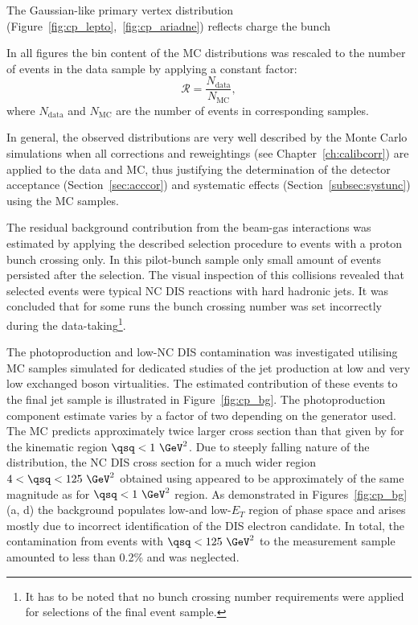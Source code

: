 The Gaussian-like primary vertex distribution (Figure~\ref{fig:cp_lepto},~\ref{fig:cp_ariadne}) reflects charge the bunch 

 In all figures the bin content of the MC distributions was rescaled to the number of events in the data sample by applying a constant factor:
\begin{equation}
\mathcal{R} = \frac{N_\text{data}}{N_\text{MC}},
\label{eq:mcrescale}
\end{equation}
where $N_\text{data}$ and $N_\text{MC}$ are the number of events in corresponding samples. 

In general, the observed distributions are very well described by the Monte Carlo simulations when all corrections and reweightings (see Chapter~\ref{ch:calibcorr}) are applied to the data and MC, thus justifying the determination of the detector acceptance (Section~\ref{sec:acccor}) and systematic effects (Section~\ref{subsec:systunc}) using the MC samples.

The residual background contribution from the beam-gas interactions was estimated by applying the described selection procedure to events with a proton bunch crossing only. In this pilot-bunch sample only small amount of events persisted after the selection. The visual inspection of this collisions revealed that selected events were typical NC DIS reactions with hard hadronic jets. It was concluded that for some runs the bunch crossing number was set incorrectly during the data-taking\footnote{It has to be noted that no bunch crossing number requirements were applied for selections of the final event sample.}.

The photoproduction and low-\qsq NC DIS contamination was investigated utilising MC samples simulated for dedicated studies of the jet production at low and very low exchanged boson virtualities. The estimated contribution of these events to the final jet sample is illustrated in Figure~\ref{fig:cp_bg}. The photoproduction component estimate varies by a factor of two depending on the generator used. The \pythia MC predicts approximately twice larger cross section than that given by \herwig for the kinematic region $\qsq < 1~\GeV^2$. Due to steeply falling nature of the \qsq distribution, the NC DIS cross section for a much wider region $4< \qsq < 125~\GeV^2$ obtained using \lepto appeared to be approximately of the same magnitude as for $\qsq < 1~\GeV^2$ region. As demonstrated in Figures~\ref{fig:cp_bg}(a, d) the background populates low-\qsq and low-$E_T$ region of phase space and arises mostly due to incorrect identification of the DIS electron candidate. In total, the contamination from events with $\qsq < 125~\GeV^2$ to the measurement sample amounted to less than 0.2\% and was neglected.



